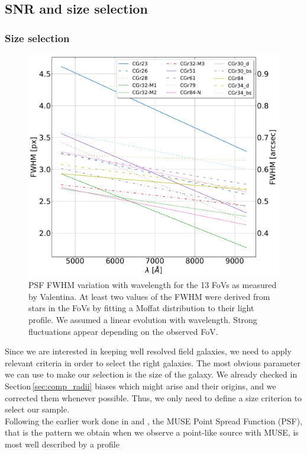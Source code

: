 \subsection{SNR and size selection}
\label{sec:cut}

\subsubsection{Size selection}
\label{sec:cut_size}

\begin{figure}[t]
	\centering
	\includegraphics[width=0.7\linewidth]{../Plots/FWHM_variation_with_lambda.pdf}
	\caption[PSF FWHM variation with wavelength.]{PSF FWHM variation with wavelength for the 13 FoVs as measured by Valentina. At least two values of the FWHM were derived from stars in the FoVs by fitting a Moffat distribution to their light profile. We assumed a linear evolution with wavelength. Strong fluctuations appear depending on the observed FoV.}
	\label{fig:FWHM_var_lambda}
\end{figure}

Since we are interested in keeping well resolved field galaxies, we need to apply relevant criteria in order to select the right galaxies. The most obvious parameter we can use to make our selection is the size of the galaxy. We already checked  in Section\,\ref{sec:comp_radii} biases which might arise and their origins, and we corrected them whenever possible. Thus, we only need to define a size criterion to select our sample. \\

Following the earlier work done in  and , the MUSE Point Spread Function (PSF), that is the pattern we obtain when we observe a point-like source with MUSE, is most well described by a  profile

